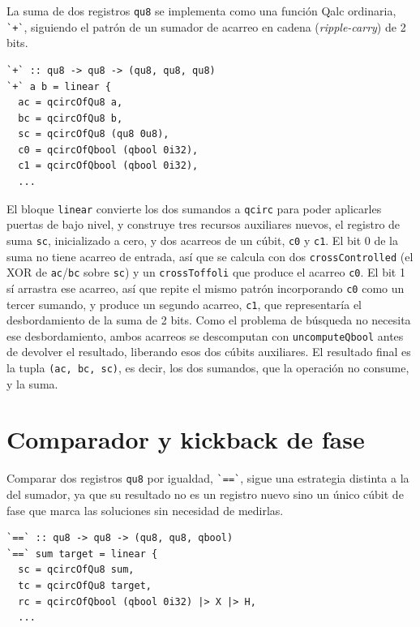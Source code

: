 La suma de dos registros \lstinline|qu8| se implementa como una función Qalc ordinaria, \lstinline|`+`|, siguiendo el patrón de un sumador de acarreo en cadena (\textit{ripple-carry}) de 2 bits.

\begin{lstlisting}[language={}, caption=Firma y preparación de recursos del sumador ripple-carry]
`+` :: qu8 -> qu8 -> (qu8, qu8, qu8)
`+` a b = linear {
  ac = qcircOfQu8 a,
  bc = qcircOfQu8 b,
  sc = qcircOfQu8 (qu8 0u8),
  c0 = qcircOfQbool (qbool 0i32),
  c1 = qcircOfQbool (qbool 0i32),
  ...
\end{lstlisting}

El bloque \lstinline|linear| convierte los dos sumandos a \lstinline|qcirc| para poder aplicarles puertas de bajo nivel, y construye tres recursos auxiliares nuevos, el registro de suma \lstinline|sc|, inicializado a cero, y dos acarreos de un cúbit, \lstinline|c0| y \lstinline|c1|. El bit 0 de la suma no tiene acarreo de entrada, así que se calcula con dos \lstinline|crossControlled| (el XOR de \lstinline|ac|/\lstinline|bc| sobre \lstinline|sc|) y un \lstinline|crossToffoli| que produce el acarreo \lstinline|c0|. El bit 1 sí arrastra ese acarreo, así que repite el mismo patrón incorporando \lstinline|c0| como un tercer sumando, y produce un segundo acarreo, \lstinline|c1|, que representaría el desbordamiento de la suma de 2 bits. Como el problema de búsqueda no necesita ese desbordamiento, ambos acarreos se descomputan con \lstinline|uncomputeQbool| antes de devolver el resultado, liberando esos dos cúbits auxiliares. El resultado final es la tupla \lstinline|(ac, bc, sc)|, es decir, los dos sumandos, que la operación no consume, y la suma.

\section{Comparador y kickback de fase}
\label{sec:grover-comparador}

Comparar dos registros \lstinline|qu8| por igualdad, \lstinline|`==`|, sigue una estrategia distinta a la del sumador, ya que su resultado no es un registro nuevo sino un único cúbit de fase que marca las soluciones sin necesidad de medirlas.

\begin{lstlisting}[language={}, caption=Preparación del ancilla de fase del comparador de igualdad]
`==` :: qu8 -> qu8 -> (qu8, qu8, qbool)
`==` sum target = linear {
  sc = qcircOfQu8 sum,
  tc = qcircOfQu8 target,
  rc = qcircOfQbool (qbool 0i32) |> X |> H,
  ...
\end{lstlisting}

